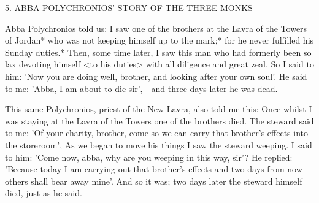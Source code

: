 5. ABBA POLYCHRONIOS' STORY
OF THE THREE MONKS

Abba Polychronios told us: I saw one of the brothers at the Lavra
of the Towers of Jordan* who was not keeping himself up to the
mark;* for he never fulfilled his Sunday duties.* Then, some time
later, I saw this man who had formerly been so lax devoting himself
<to his duties> with all diligence and great zeal. So I said to him:
'Now you are doing well, brother, and looking after your own soul'.
He said to me: 'Abba, I am about to die sir',—and three days later
he was dead.

This same Polychronios, priest of the New Lavra, also told me
this: Once whilst I was staying at the Lavra of the Towers one of
the brothers died. The steward said to me: 'Of your charity, brother,
come so we can carry that brother's effects into the storeroom', As
we began to move his things I saw the steward weeping. I said to
him: 'Come now, abba, why are you weeping in this way, sir'? He
replied: 'Because today I am carrying out that brother's effects and
two days from now others shall bear away mine'. And so it was;
two days later the steward himself died, just as he said.

